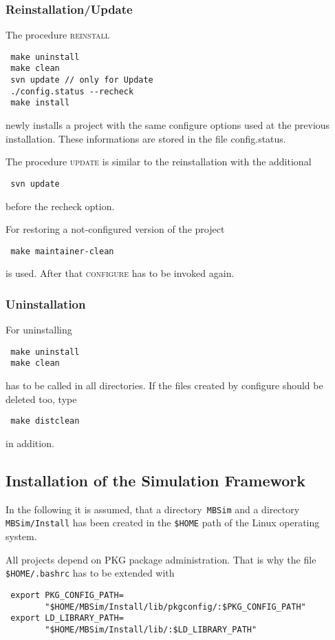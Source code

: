 \subsubsection{Reinstallation/Update}
The procedure \textsc{reinstall}
\begin{verbatim}
 make uninstall 
 make clean
 svn update // only for Update
 ./config.status --recheck
 make install
\end{verbatim}
newly installs a project with the same configure options used at the previous installation. These informations are stored in the file config.status.\par 

The procedure \textsc{update} is similar to the reinstallation with the additional 
\begin{verbatim} 
 svn update 
\end{verbatim}
before the recheck option.\par

For restoring a not-configured version of the project
\begin{verbatim}
 make maintainer-clean
\end{verbatim}
is used. After that \textsc{configure} has to be invoked again.

\subsubsection{Uninstallation}
For uninstalling
\begin{verbatim}
 make uninstall
 make clean
\end{verbatim}
has to be called in all directories. If the files created by configure should be deleted too, type 
\begin{verbatim} 
 make distclean 
\end{verbatim} 
in addition.

\subsection{Installation of the Simulation Framework\label{sec:install:simulation}}
In the following it is assumed, that a directory~\texttt{MBSim} and a directory \texttt{MBSim/Install} has been created in the \texttt{\$HOME} path of the Linux operating system.\par
All projects depend on PKG package administration. That is why the file \texttt{\$HOME/.bashrc} has to be extended with
\begin{verbatim}
 export PKG_CONFIG_PATH=
        "$HOME/MBSim/Install/lib/pkgconfig/:$PKG_CONFIG_PATH"
 export LD_LIBRARY_PATH=
        "$HOME/MBSim/Install/lib/:$LD_LIBRARY_PATH"
\end{verbatim}

